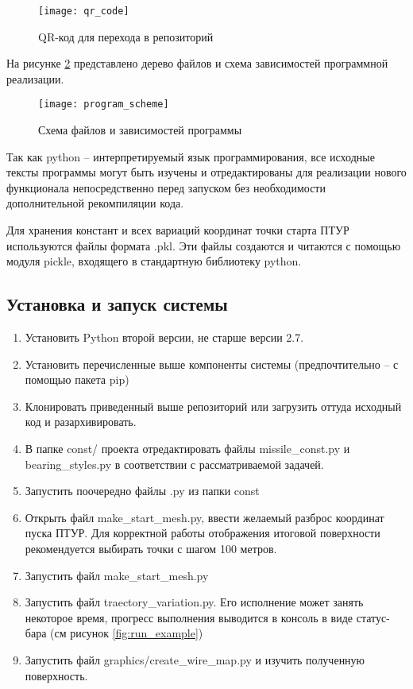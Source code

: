 \begin{figure}[!h]
\begin{center}
	\texttt{[image: qr\_code]}
	\caption{QR-код для перехода в репозиторий}
	\label{fig:qr_code}
\end{center}
\end{figure}

На рисунке \ref{fig:program_scheme} представлено дерево файлов и схема зависимостей программной реализации.

\begin{figure}[!h]
\begin{center}
	\texttt{[image: program\_scheme]}
	\caption{Схема файлов и зависимостей программы}
	\label{fig:program_scheme}
\end{center}
\end{figure}

Так как python – интерпретируемый язык программирования, все исходные тексты программы могут быть изучены и отредактированы для реализации нового функционала непосредственно перед запуском без необходимости дополнительной рекомпиляции кода.

Для хранения констант и всех вариаций координат точки старта ПТУР используются файлы формата .pkl. Эти файлы создаются и читаются с помощью модуля pickle, входящего в стандартную библиотеку python.

\subsection{Установка и запуск системы}
\begin{enumerate}[1.]
	\item Установить Python второй версии, не старше версии 2.7.
	\item Установить перечисленные выше компоненты системы (предпочтительно – с помощью пакета pip)
	\item Клонировать приведенный выше репозиторий или загрузить оттуда исходный код и разархивировать.
	\item В папке const/ проекта отредактировать файлы missile\_const.py и bearing\_styles.py в соответствии с рассматриваемой задачей.
	\item Запустить поочередно файлы .py из папки const
	\item Открыть файл make\_start\_mesh.py, ввести желаемый разброс координат пуска ПТУР. Для корректной работы отображения итоговой поверхности рекомендуется выбирать точки с шагом 100 метров.
	\item Запустить файл make\_start\_mesh.py
	\item Запустить файл traectory\_variation.py. Его исполнение может занять некоторое время, прогресс выполнения выводится в консоль в виде статус-бара (см рисунок \ref{fig:run_example})
	\item Запустить файл graphics/create\_wire\_map.py и изучить полученную поверхность. 
\end{enumerate}

